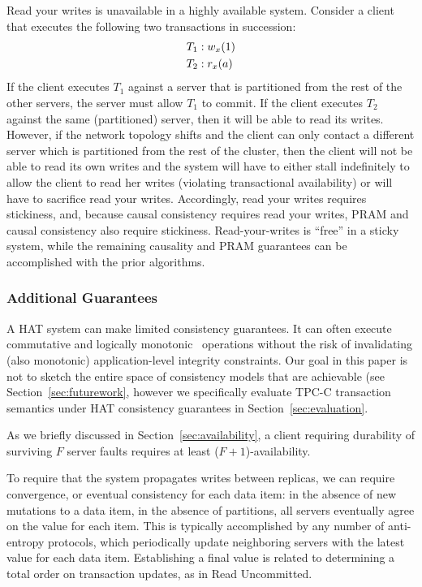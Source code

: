 Read your writes is unavailable in a highly available system. Consider
a client that executes the following two transactions in succession:
\vspace{-.5em}
\begin{align*}
\small
T_1 &: w_x(1)
\\T_2 &: r_x(a)
\end{align*}
If the client executes $T_1$ against a server that is partitioned from
the rest of the other servers, the server must allow $T_1$ to
commit. If the client executes $T_2$ against the same (partitioned)
server, then it will be able to read its writes. However, if the
network topology shifts and the client can only contact a different
server which is partitioned from the rest of the cluster, then the
client will not be able to read its own writes and the system will
have to either stall indefinitely to allow the client to read her
writes (violating transactional availability) or will have to
sacrifice read your writes. Accordingly, read your writes requires
stickiness, and, because causal consistency requires read your writes,
PRAM and causal consistency also require stickiness. Read-your-writes
is ``free'' in a sticky system, while the remaining causality and PRAM
guarantees can be accomplished with the prior algorithms.

\subsubsection{Additional Guarantees}

 A HAT system can make limited
consistency guarantees. It can often execute commutative and logically
monotonic~\cite{calm} operations without the risk of invalidating
(also monotonic) application-level integrity constraints. Our goal in
this paper is not to sketch the entire space of consistency models
that are achievable (see Section~\ref{sec:futurework}, however we
specifically evaluate TPC-C transaction semantics under HAT
consistency guarantees in Section~\ref{sec:evaluation}.

\vspace{.5em} As we briefly discussed in
Section~\ref{sec:availability}, a client requiring durability
of surviving $F$ server faults requires at least ($F+1$)-availability.

\vspace{.5em} To require that the
system propagates writes between replicas, we can require convergence,
or eventual consistency for each data item: in the absence of new
mutations to a data item, in the absence of partitions, all servers
eventually agree on the value for each item. This is typically
accomplished by any number of anti-entropy protocols, which
periodically update neighboring servers with the latest value for each
data item. Establishing a final value is related to determining a
total order on transaction updates, as in Read Uncommitted.

